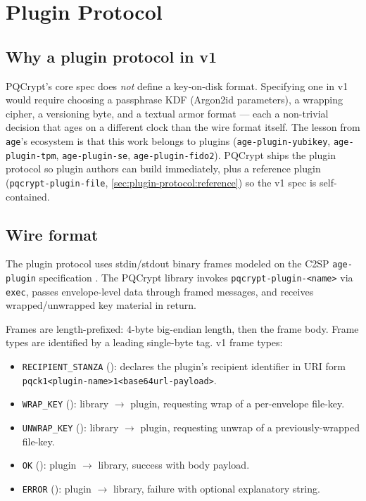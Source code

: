 \section{Plugin Protocol}
\label{sec:plugin-protocol}

\subsection{Why a plugin protocol in v1}

PQCrypt's core spec does \emph{not} define a key-on-disk format. Specifying one in v1 would require choosing a passphrase KDF (Argon2id parameters), a wrapping cipher, a versioning byte, and a textual armor format --- each a non-trivial decision that ages on a different clock than the wire format itself. The lesson from \texttt{age}'s ecosystem is that this work belongs to plugins (\texttt{age-plugin-yubikey}, \texttt{age-plugin-tpm}, \texttt{age-plugin-se}, \texttt{age-plugin-fido2}). PQCrypt ships the plugin protocol so plugin authors can build immediately, plus a reference plugin (\texttt{pqcrypt-plugin-file}, \cref{sec:plugin-protocol:reference}) so the v1 spec is self-contained.

\subsection{Wire format}

The plugin protocol uses stdin/stdout binary frames modeled on the C2SP \texttt{age-plugin} specification \citep{c2sp-age-plugin}. The PQCrypt library invokes \texttt{pqcrypt-plugin-\textless{}name\textgreater} via \texttt{exec}, passes envelope-level data through framed messages, and receives wrapped/unwrapped key material in return.

Frames are length-prefixed: 4-byte big-endian length, then the frame body. Frame types are identified by a leading single-byte tag. v1 frame types:

\begin{itemize}
\item \texttt{RECIPIENT\_STANZA} (): declares the plugin's recipient identifier in URI form \texttt{pqck1\textless{}plugin-name\textgreater{}1\textless{}base64url-payload\textgreater}.
\item \texttt{WRAP\_KEY} (): library $\to$ plugin, requesting wrap of a per-envelope file-key.
\item \texttt{UNWRAP\_KEY} (): library $\to$ plugin, requesting unwrap of a previously-wrapped file-key.
\item \texttt{OK} (): plugin $\to$ library, success with body payload.
\item \texttt{ERROR} (): plugin $\to$ library, failure with optional explanatory string.
\end{itemize}

